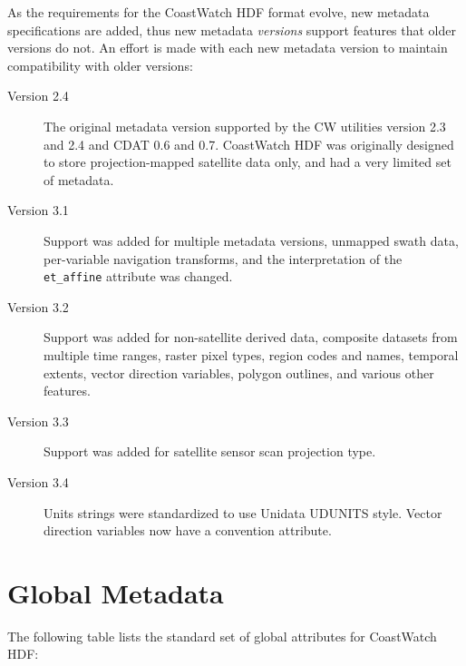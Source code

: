 As the requirements for the CoastWatch HDF format evolve, new metadata
specifications are added, thus new metadata {\em versions} support
features that older versions do not. An effort is made with each new
metadata version to maintain compatibility with older versions:
\begin{description}

  \item[Version 2.4] The original metadata version supported by the
  CW utilities version 2.3 and 2.4 and CDAT 0.6 and 0.7. CoastWatch
  HDF was originally designed to store projection-mapped satellite
  data only, and had a very limited set of metadata.

  \item[Version 3.1] Support was added for multiple metadata versions,
  unmapped swath data, per-variable navigation transforms, and the
  interpretation of the {\tt et\_affine} attribute was changed.

  \item[Version 3.2] Support was added for non-satellite derived data,
  composite datasets from multiple time ranges, raster pixel types,
  region codes and names, temporal extents, vector direction
  variables, polygon outlines, and various other features.

  \item[Version 3.3] Support was added for satellite sensor scan
  projection type.

  \item[Version 3.4] Units strings were standardized to use Unidata
  UDUNITS style.  Vector direction variables now have a convention
  attribute.

\end{description}

\section{Global Metadata}

The following table lists the standard set of global attributes for
CoastWatch HDF:

